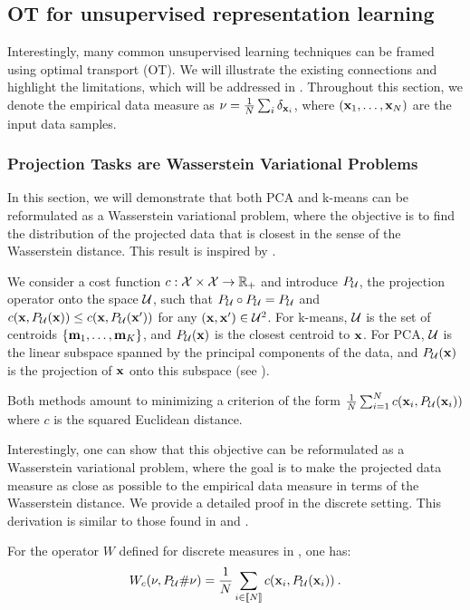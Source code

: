 \subsection{OT for unsupervised representation learning}

Interestingly, many common unsupervised learning techniques can be framed using optimal transport (OT). We will illustrate the existing connections and highlight the limitations, which will be addressed in . Throughout this section, we denote the empirical data measure as $\nu = \frac{1}{N} \sum_i \delta_{{\mathbf{x}}_i}$, where $({\mathbf{x}}_1, \ldots, {\mathbf{x}}_N)$ are the input data samples.

\subsubsection{Projection Tasks are Wasserstein Variational Problems}

In this section, we will demonstrate that both PCA and k-means can be reformulated as a Wasserstein variational problem, where the objective is to find the distribution of the projected data that is closest in the sense of the Wasserstein distance. This result is inspired by \citep{Canas12}.

We consider a cost function $c : \mathcal{X} \times \mathcal{X} \to \mathbb{R}_+$ and introduce $P_{{\mathcal{U}}}$, the projection operator onto the space ${\mathcal{U}}$, such that $P_{{\mathcal{U}}} \circ P_{{\mathcal{U}}} = P_{{\mathcal{U}}}$ and $c({\mathbf{x}}, P_{{\mathcal{U}}}({\mathbf{x}})) \leq c({\mathbf{x}}, P_{{\mathcal{U}}}({\mathbf{x}}'))$ for any $({\mathbf{x}}, {\mathbf{x}}') \in {\mathcal{U}}^2$. For k-means, ${\mathcal{U}}$ is the set of centroids $\{{\mathbf{m}}_1, \ldots, {\mathbf{m}}_K\}$, and $P_{{\mathcal{U}}}({\mathbf{x}})$ is the closest centroid to ${\mathbf{x}}$. For PCA, ${\mathcal{U}}$ is the linear subspace spanned by the principal components of the data, and $P_{{\mathcal{U}}}({\mathbf{x}})$ is the projection of ${\mathbf{x}}$ onto this subspace (see ).

Both methods amount to minimizing a criterion of the form $\frac{1}{N} \sum_{i=1}^N c({\mathbf{x}}_i, P_{{\mathcal{U}}}({\mathbf{x}}_i))$ where $c$ is the squared Euclidean distance.

Interestingly, one can show that this objective can be reformulated as a Wasserstein variational problem, where the goal is to make the projected data measure as close as possible to the empirical data measure in terms of the Wasserstein distance. We provide a detailed proof in the discrete setting. This derivation is similar to those found in \citep{Canas12} and \citep{vayer2023controlling}.

\begin{lemma}
    For the operator $W$ defined for discrete measures in , one has:
    \begin{align}
        W_c(\nu, P_{{\mathcal{U}}} \# \nu) = \frac{1}{N} \sum_{i \in {[\![N]\!]}} c(\mathbf{x}_i, P_{{\mathcal{U}}}(\mathbf{x}_i)) \:.
    \end{align}
\end{lemma}

